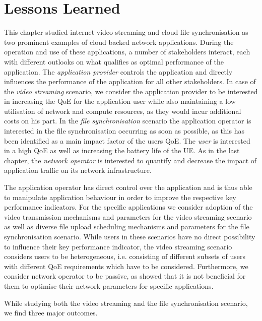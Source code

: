\section{Lessons Learned}\label{sec:application:lessons_learned}
This chapter studied internet video streaming and cloud file synchronisation as two prominent examples of cloud backed network applications.
During the operation and use of these applications, a number of stakeholders interact, each with different outlooks on what qualifies as optimal performance of the application.
The \emph{application provider} controls the application and directly influences the performance of the application for all other stakeholders.
In case of the \emph{video streaming} scenario, we consider the application provider to be interested in increasing the \gls{QoE} for the application user while also maintaining a low utilisation of network and compute resources, as they would incur additional costs on his part.
In the \emph{file synchronisation} scenario the application operator is interested in the file synchronisation occurring as soon as possible, as this has been identified as a main impact factor of the users \gls{QoE}.
The \emph{user} is interested in a high \gls{QoE} as well as increasing the battery life of the \gls{UE}.
As in the last chapter, the \emph{network operator} is interested to quantify and decrease the impact of application traffic on its network infrastructure.

The application operator has direct control over the application and is thus able to manipulate application behaviour in order to improve the respective key performance indicators.
For the specific applications we consider adoption of the video transmission mechanisms and parameters for the video streaming scenario as well as diverse file upload scheduling mechanisms and parameters for the file synchronisation scenario.
While users in these scenarios have no direct possibility to influence their key performance indicator, the video streaming scenario considers users to be heterogeneous, i.e. consisting of different subsets of users with different \gls{QoE} requirements which have to be considered.
Furthermore, we consider network operator to be passive, as  showed that it is not beneficial for them to optimise their network parameters for specific applications.

While studying both the video streaming and the file synchronisation scenario, we find three major outcomes.

